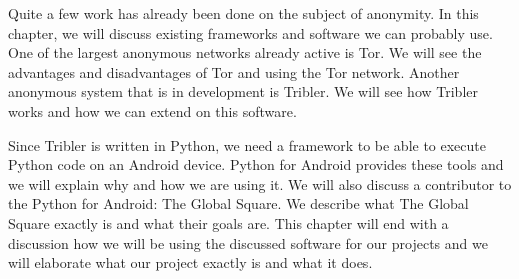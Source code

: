 Quite a few work has already been done on the subject of anonymity. In this chapter, we will discuss existing frameworks and software we can probably use. One of the largest anonymous networks already active is Tor. We will see the advantages and disadvantages of Tor and using the Tor network. Another anonymous system that is in development is Tribler. We will see how Tribler works and how we can extend on this software.
	
Since Tribler is written in Python, we need a framework to be able to execute Python code on an Android device. Python for Android provides these tools and we will explain why and how we are using it. We will also discuss a contributor to the Python for Android: The Global Square. We describe what The Global Square exactly is and what their goals are. This chapter will end with a discussion how we will be using the discussed software for our projects and we will elaborate what our project exactly is and what it does.
